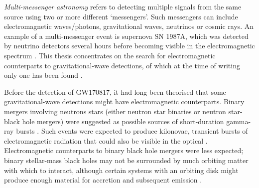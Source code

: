 \begin{colsection}

\emph{Multi-messenger astronomy} refers to detecting multiple signals from the same source using two or more different `messengers'. Such messengers can include electromagnetic waves/photons, gravitational waves, neutrinos or cosmic rays. An example of a multi-messenger event is supernova SN 1987A, which was detected by neutrino detectors several hours before becoming visible in the electromagnetic spectrum \citep{SN1987A}. This thesis concentrates on the search for electromagnetic counterparts to gravitational-wave detections, of which at the time of writing only one has been found \citep[GW170817;][]{GW170817}.

Before the detection of GW170817, it had long been theorised that some gravitational-wave detections might have electromagnetic counterparts. Binary mergers involving neutrons stars (either neutron star binaries or neutron star-black hole mergers) were suggested as possible sources of short-duration gamma-ray bursts \citep{SGRBs}. Such events were expected to produce kilonovae, transient bursts of electromagnetic radiation that could also be visible in the optical \citep[these events were named ``kilo''-novae as they were predicted to reach luminosities approximately 1000 times that of a classical nova;][]{GW_kilonova}. Electromagnetic counterparts to binary black hole mergers were less expected; binary stellar-mass black holes may not be surrounded by much orbiting matter with which to interact, although certain systems with an orbiting disk might produce enough material for accretion and subsequent emission \citep{BBH_EM}.

\end{colsection}


